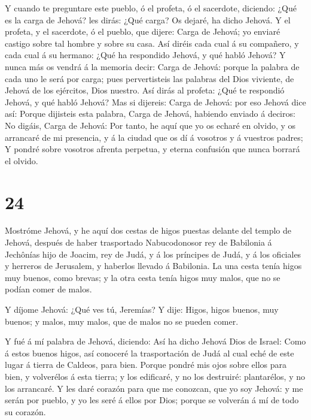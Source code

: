  Y cuando te preguntare este pueblo, ó el profeta, ó el
sacerdote, diciendo: ¿Qué es la carga de Jehová? les dirás: ¿Qué carga?
Os dejaré, ha dicho Jehová.  Y el profeta, y el sacerdote,
ó el pueblo, que dijere: Carga de Jehová; yo enviaré castigo sobre tal
hombre y sobre su casa.  Así diréis cada cual á su
compañero, y cada cual á su hermano: ¿Qué ha respondido Jehová, y qué
habló Jehová?  Y nunca más os vendrá á la memoria decir:
Carga de Jehová: porque la palabra de cada uno le será por carga; pues
pervertisteis las palabras del Dios viviente, de Jehová de los
ejércitos, Dios nuestro.  Así dirás al profeta: ¿Qué te
respondió Jehová, y qué habló Jehová?  Mas si dijereis:
Carga de Jehová: por eso Jehová dice así: Porque dijisteis esta palabra,
Carga de Jehová, habiendo enviado á deciros: No digáis, Carga de Jehová:
 Por tanto, he aquí que yo os echaré en olvido, y os
arrancaré de mi presencia, y á la ciudad que os dí á vosotros y á
vuestros padres;  Y pondré sobre vosotros afrenta perpetua,
y eterna confusión que nunca borrará el olvido.

\hypertarget{section-23}{%
\section{24}\label{section-23}}

 Mostróme Jehová, y he aquí dos cestas de higos puestas
delante del templo de Jehová, después de haber trasportado Nabucodonosor
rey de Babilonia á Jechônías hijo de Joacim, rey de Judá, y á los
príncipes de Judá, y á los oficiales y herreros de Jerusalem, y haberlos
llevado á Babilonia.  La una cesta tenía higos muy buenos,
como brevas; y la otra cesta tenía higos muy malos, que no se podían
comer de malos.

 Y díjome Jehová: ¿Qué ves tú, Jeremías? Y dije: Higos,
higos buenos, muy buenos; y malos, muy malos, que de malos no se pueden
comer.

 Y fué á mí palabra de Jehová, diciendo:  Así ha
dicho Jehová Dios de Israel: Como á estos buenos higos, así conoceré la
trasportación de Judá al cual eché de este lugar á tierra de Caldeos,
para bien.  Porque pondré mis ojos sobre ellos para bien, y
volverélos á esta tierra; y los edificaré, y no los destruiré:
plantarélos, y no los arrancaré.  Y les daré corazón para
que me conozcan, que yo soy Jehová: y me serán por pueblo, y yo les seré
á ellos por Dios; porque se volverán á mí de todo su corazón.

